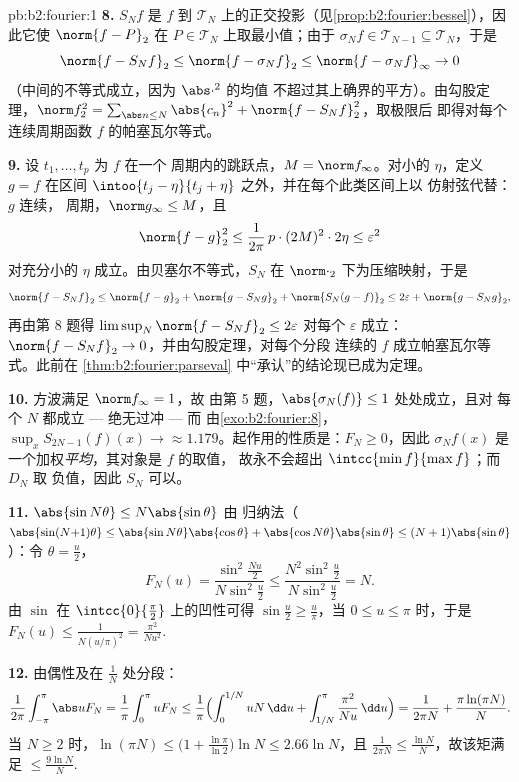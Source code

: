 \begin{solution}{pb:b2:fourier:1}
\textbf{8.} $S_Nf$ 是 $f$ 到
$\mathcal T_N$ 上的正交投影（见\cref{prop:b2:fourier:bessel}），因此它使
$\norm{f - P}_2$ 在 $P \in \mathcal T_N$ 上取最小值；由于 $\sigma_Nf
\in \mathcal T_{N-1} \subseteq \mathcal T_N$，于是
\[
\norm{f - S_Nf}_2 \leq \norm{f - \sigma_Nf}_2
\leq \norm{f - \sigma_Nf}_\infty \to 0
\]
（中间的不等式成立，因为 $\abs\cdot^2$ 的均值
不超过其上确界的平方）。由勾股定理，$\norm f_2^2 = \sum_{\abs
n\leq N}\abs{c_n}^2 + \norm{f - S_Nf}_2^2$，取极限后
即得对每个连续周期函数 $f$ 的帕塞瓦尔等式。

\textbf{9.} 设 $t_1, \dots, t_p$ 为 $f$ 在一个
周期内的跳跃点，$M = \norm f_\infty$。对小的 $\eta$，定义 $g = f$
在区间 $\intoo{t_j - \eta}{t_j + \eta}$ 之外，并在每个此类区间上以
仿射弦代替：$g$ 连续，
周期，$\norm g_\infty \leq M$，且
\[
\norm{f - g}_2^2 \leq \frac{1}{2\pi}\,p\cdot(2M)^2\cdot2\eta
\leq \varepsilon^2
\]
对充分小的 $\eta$ 成立。由贝塞尔不等式，$S_N$ 在
$\norm\cdot_2$ 下为压缩映射，于是
\[
\norm{f - S_Nf}_2
\leq \norm{f - g}_2 + \norm{g - S_Ng}_2 + \norm{S_N(g -
f)}_2
\leq 2\varepsilon + \norm{g - S_Ng}_2 ,
\]
再由第 8 题得 $\limsup_N\norm{f - S_Nf}_2 \leq
2\varepsilon$ 对每个 $\varepsilon$ 成立：$\norm{f - S_Nf}_2 \to
0$，并由勾股定理，对每个分段
连续的 $f$ 成立帕塞瓦尔等式。此前在
\cref{thm:b2:fourier:parseval} 中“承认”的结论现已成为定理。

\textbf{10.} 方波满足 $\norm f_\infty = 1$，故
由第 5 题，$\abs{\sigma_N(f)} \leq 1$ 处处成立，且对
每个 $N$ 都成立 --- 绝无过冲 --- 而
由\cref{exo:b2:fourier:8}，$\sup_xS_{2N-1}(f)(x) \to
\approx 1.179$。起作用的性质是：$F_N \geq 0$，因此
$\sigma_Nf(x)$ 是一个加权\emph{平均}，其对象是 $f$ 的取值，
故永不会超出 $\intcc{\min f}{\max f}$；而 $D_N$ 取
负值，因此 $S_N$ 可以。

\textbf{11.} $\abs{\sin N\theta} \leq N\abs{\sin\theta}$ 由
归纳法（$\abs{\sin(N{+}1)\theta} \leq
\abs{\sin N\theta}\abs{\cos\theta} +
\abs{\cos N\theta}\abs{\sin\theta} \leq
(N+1)\abs{\sin\theta}$）：令 $\theta = \frac u2$，
\[
F_N(u) = \frac{\sin^2\frac{Nu}2}{N\sin^2\frac u2}
\leq \frac{N^2\sin^2\frac u2}{N\sin^2\frac u2} = N .
\]
由 $\sin$ 在 $\intcc{0}{\frac\pi2}$ 上的凹性可得
$\sin\frac u2 \geq \frac{u}{\pi}$，当 $0 \leq u \leq \pi$ 时，于是
$F_N(u) \leq \frac{1}{N(u/\pi)^2} = \frac{\pi^2}{Nu^2}$.

\textbf{12.} 由偶性及在 $\frac1N$ 处分段：
\[
\frac{1}{2\pi}\int_{-\pi}^{\pi}\abs uF_N
= \frac1\pi\int_0^\pi uF_N
\leq \frac1\pi\Bigl(\int_0^{1/N}uN\,\dd u +
\int_{1/N}^{\pi}\frac{\pi^2}{Nu}\,\dd u\Bigr)
= \frac{1}{2\pi N} + \frac{\pi\ln(\pi N)}{N} .
\]
当 $N \geq 2$ 时，$\ln(\pi N) \leq \bigl(1 +
\frac{\ln\pi}{\ln2}\bigr)\ln N \leq 2.66\ln N$，且
$\frac{1}{2\pi N} \leq \frac{\ln N}{N}$，故该矩满足
$\leq \frac{9\ln N}{N}$.


\end{solution}
